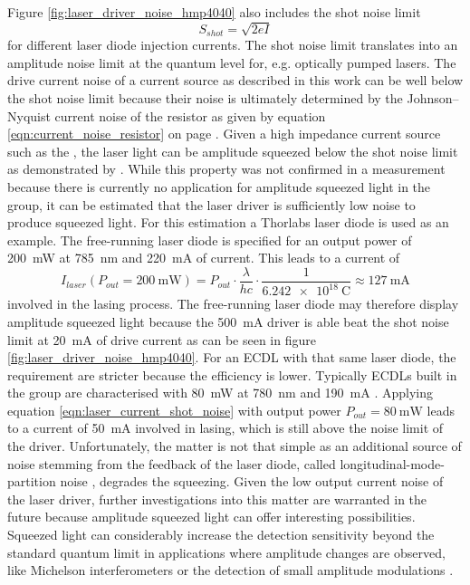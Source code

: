 Figure \ref{fig:laser_driver_noise_hmp4040} also includes the shot noise limit
\begin{equation}
    S_{shot} = \sqrt{2 e I}
\end{equation}
for different laser diode injection currents. The shot noise limit translates into an amplitude noise limit at the quantum level for, e.g. optically pumped lasers. The drive current noise of a current source as described in this work can be well below the shot noise limit because their noise is ultimately determined by the Johnson–Nyquist current noise of the resistor as given by equation \ref{eqn:current_noise_resistor} on page \pageref{eqn:current_noise_resistor}. Given a high impedance current source such as the , the laser light can be amplitude squeezed below the shot noise limit as demonstrated by \citeauthor{diode_laser_shot_noise1} \cite{diode_laser_shot_noise1}. While this property was not confirmed in a measurement because there is currently no application for amplitude squeezed light in the group, it can be estimated that the laser driver is sufficiently low noise to produce squeezed light. For this estimation a Thorlabs  \cite{datasheet_thorlabs_780nm} laser diode is used as an example. The free-running laser diode is specified  for an output power of \qty{200}{\mW} at \qty{785}{\nm} and \qty{220}{\mA} of current. This leads to a current of
\begin{equation}
    I_{laser}(P_{out}=\qty{200}{\mW}) = P_{out} \cdot \frac{\lambda}{h c} \cdot \frac{1}{\qty{6.242e18}{\coulomb}} \approx \qty{127}{\mA} \label{eqn:laser_current_shot_noise}
\end{equation}
involved in the lasing process. The free-running laser diode may therefore display amplitude squeezed light because the \qty{500}{\mA} driver is able beat the shot noise limit at \qty{20}{\mA} of drive current as can be seen in figure \ref{fig:laser_driver_noise_hmp4040}. For an ECDL with that same laser diode, the requirement are stricter because the efficiency is lower. Typically ECDLs built in the group are characterised with \qty{80}{\mW} at \qty{780}{\nm} and \qty{190}{\mA} \cite{thesis_tilman}. Applying equation \ref{eqn:laser_current_shot_noise} with output power $P_{out}=\qty{80}{\mW}$ leads to a current of \qty{50}{\mA} involved in lasing, which is still above the noise limit of the driver. Unfortunately, the matter is not that simple as an additional source of noise stemming from the feedback of the laser diode, called longitudinal-mode-partition noise \cite{laser_squeezed_light2,laser_squeezed_light}, degrades the squeezing. Given the low output current noise of the laser driver, further investigations into this matter are warranted in the future because amplitude squeezed light can offer interesting possibilities. Squeezed light can considerably increase the detection sensitivity beyond the standard quantum limit in applications where amplitude changes are observed, like Michelson interferometers \cite{shot_noise_ligo} or the detection of small amplitude modulations \cite{shot_noise_amplitude_modulation}.


